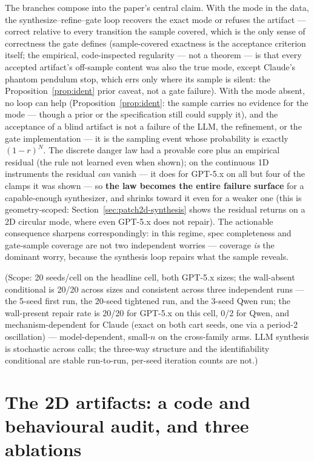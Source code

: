 \documentclass[11pt]{article}
\theoremstyle{definition}
\theoremstyle{remark}
\begin{document}
The branches compose into the paper's central claim. With the mode in the data, the synthesize--refine--gate loop recovers the exact mode or refuses the artifact --- correct relative to every transition the sample covered, which is the only sense of correctness the gate defines (sample-covered exactness is the acceptance criterion itself; the empirical, code-inspected regularity --- not a theorem --- is that every accepted artifact's off-sample content was also the true mode, except Claude's phantom pendulum stop, which errs only where its sample is silent: the Proposition~\ref{prop:ident} prior caveat, not a gate failure). With the mode absent, no loop can help (Proposition~\ref{prop:ident}: the sample carries no evidence for the mode --- though a prior or the specification still could supply it), and the acceptance of a blind artifact is not a failure of the LLM, the refinement, or the gate implementation --- it is the sampling event whose probability is exactly $(1-r)^N$. The discrete danger law had a provable core plus an empirical residual (the rule not learned even when shown); on the continuous 1D instruments the residual \emph{can} vanish --- it does for GPT-5.x on all but four of the clamps it was shown --- so \textbf{the law becomes the entire failure surface} for a capable-enough synthesizer, and shrinks toward it even for a weaker one (this is geometry-scoped: Section~\ref{sec:patch2d-synthesis} shows the residual returns on a 2D circular mode, where even GPT-5.x does not repair). The actionable consequence sharpens correspondingly: in this regime, spec completeness and gate-sample coverage are not two independent worries --- coverage \emph{is} the dominant worry, because the synthesis loop repairs what the sample reveals.

(Scope: 20 seeds/cell on the headline cell, both GPT-5.x sizes; the wall-absent conditional is 20/20 across sizes and consistent across three independent runs --- the 5-seed first run, the 20-seed tightened run, and the 3-seed Qwen run; the wall-present repair rate is 20/20 for GPT-5.x on this cell, 0/2 for Qwen, and mechanism-dependent for Claude (exact on both cart seeds, one via a period-2 oscillation) --- model-dependent, small-$n$ on the cross-family arms. LLM synthesis is stochastic across calls; the three-way structure and the identifiability conditional are stable run-to-run, per-seed iteration counts are not.)


\section{The 2D artifacts: a code and behavioural audit, and three ablations}
\label{sup:artifacts}
\end{document}
